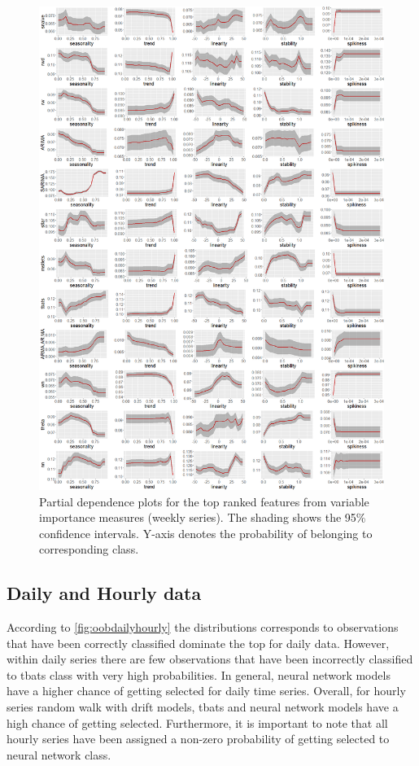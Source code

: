 \documentclass[11pt,a4paper,]{article}
\begin{document}
\begin{figure}
\centering
\includegraphics{figures/weeklypdp-1.png}
\caption{\label{fig:weeklypdp}Partial dependence plots for the top ranked
features from variable importance measures (weekly series). The shading
shows the 95\% confidence intervals. Y-axis denotes the probability of
belonging to corresponding class.}
\end{figure}

\newpage

\subsection{Daily and Hourly data}\label{daily-and-hourly-data}

According to \autoref{fig:oobdailyhourly} the distributions corresponds
to observations that have been correctly classified dominate the top for
daily data. However, within daily series there are few observations that
have been incorrectly classified to tbats class with very high
probabilities. In general, neural network models have a higher chance of
getting selected for daily time series. Overall, for hourly series
random walk with drift models, tbats and neural network models have a
high chance of getting selected. Furthermore, it is important to note
that all hourly series have been assigned a non-zero probability of
getting selected to neural network class.
\end{document}
